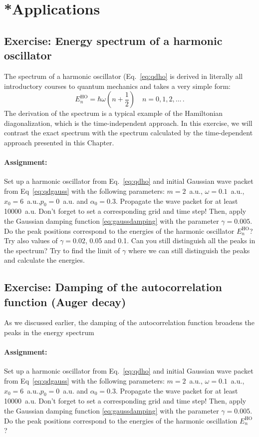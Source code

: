 \section{*Applications}

\subsection*{Exercise: Energy spectrum of a harmonic oscillator}

The spectrum of a harmonic oscillator (Eq.~\eqref{eq:qdho} is derived in literally all introductory courses to quantum mechanics and takes a very simple form:
\begin{equation*}
    E_n^\mathrm{HO} = \hbar\omega\left(n+\frac{1}{2}\right) \quad n=0,1,2,\dots \, .
\end{equation*}
The derivation of the spectrum is a typical example of the Hamiltonian diagonalization, which is the time-independent approach. In this exercise, we will contrast the exact spectrum with the spectrum calculated by the time-dependent approach presented in this Chapter.

\paragraph{Assignment:} Set up a harmonic oscillator from Eq.~\eqref{eq:qdho} and initial Gaussian wave packet from Eq~\eqref{eq:qdgauss} with the following parameters: $m=2$~a.u., $\omega=0.1$~a.u., $x_0=6$~a.u.,$p_0=0$~a.u. and $\alpha_0 = 0.3$. Propagate the wave packet for at least 10000~a.u. Don't forget to set a corresponding grid and time step! Then, apply the Gaussian damping function \eqref{eq:gaussdamping} with the parameter $\gamma = 0.005$. Do the peak positions correspond to the energies of the harmonic oscillator $E_n^\mathrm{HO}$? Try also values of $\gamma=0.02$, 0.05 and 0.1. Can you still distinguish all the peaks in the spectrum? Try to find the limit of $\gamma$ where we can still distinguish the peaks and calculate the energies. 

\subsection*{Exercise: Damping of the autocorrelation function (Auger decay)}

As we discussed earlier, the damping of the autocorrelation function broadens the peaks in the energy spectrum

\paragraph{Assignment:} Set up a harmonic oscillator from Eq.~\eqref{eq:qdho} and initial Gaussian wave packet from Eq~\eqref{eq:qdgauss} with the following parameters: $m=2$~a.u., $\omega=0.1$~a.u., $x_0=6$~a.u.,$p_0=0$~a.u. and $\alpha_0 = 0.3$. Propagate the wave packet for at least 10000~a.u. Don't forget to set a corresponding grid and time step! Then, apply the Gaussian damping function \eqref{eq:gaussdamping} with the parameter $\gamma = 0.005$. Do the peak positions correspond to the energies of the harmonic oscillation $E_n^\mathrm{HO}$?


